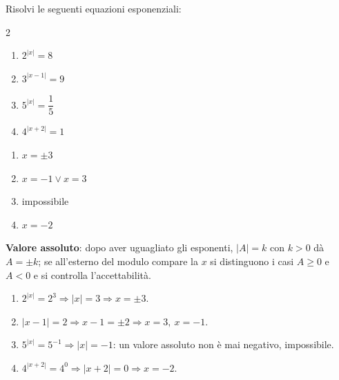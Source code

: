\begin{question}[ID=4.1, subtitle={Equazioni esponenziali con valore assoluto all'esponente}, difficulty=facile, tags={equazioni, esponenziali, valore assoluto}]
Risolvi le seguenti equazioni esponenziali:
\begin{center}\begin{minipage}{0.92\linewidth}
\begin{multicols}{2}
\begin{enumerate}[leftmargin=3.2cm]
\item $2^{|x|} = 8$
\item $3^{|x-1|} = 9$
\item $5^{|x|} = \dfrac{1}{5}$
\item $4^{|x+2|} = 1$
\end{enumerate}
\end{multicols}
\end{minipage}\end{center}
\begin{solution}
\begin{enumerate}
    \item $x=\pm3$
    \item $x=-1\vee x=3$
    \item impossibile
    \item $x=-2$
\end{enumerate}
\end{solution}
\begin{explanation}
\textbf{Valore assoluto}: dopo aver uguagliato gli esponenti, $|A|=k$ con $k>0$ dà $A=\pm k$; se all'esterno del modulo compare la $x$ si distinguono i casi $A\geq0$ e $A<0$ e si controlla l'accettabilità.
\begin{enumerate}
    \item $2^{|x|}=2^3 \Rightarrow |x|=3 \Rightarrow x=\pm3$.
    \item $|x-1|=2 \Rightarrow x-1=\pm2 \Rightarrow x=3,\ x=-1$.
    \item $5^{|x|}=5^{-1} \Rightarrow |x|=-1$: un valore assoluto non è mai negativo, impossibile.
    \item $4^{|x+2|}=4^0 \Rightarrow |x+2|=0 \Rightarrow x=-2$.
\end{enumerate}
\end{explanation}
\end{question}


